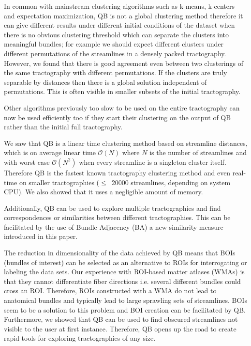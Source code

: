 \documentclass{bioinfo}
\begin{document}
In common with mainstream clustering algorithms such as k-means,
k-centers and expectation maximization, QB is not a global clustering
method therefore it can give different results under different initial
conditions of the dataset when there is no obvious clustering threshold
which can separate the clusters into meaningful bundles; for example we
should expect different clusters under different permutations of the
streamlines in a densely packed tractography. However, we found that
there is good agreement even between two clusterings of the same
tractography with different permutations. If the clusters are truly
separable by distances then there is a global solution independent of
permutations. This is often visible in smaller subsets of the initial
tractography.

Other algorithms previously too slow to be used on the entire
tractography can now be used efficiently too if they start their clustering
on the output of QB rather than the initial full tractography.

We saw that QB is a linear time clustering method based on streamline
distances, which is on average linear time $\mathcal{O}(N)$ where $N$ is
the number of streamlines and with worst case $\mathcal{O}(N^{2})$ when
every streamline is a singleton cluster itself. Therefore QB is the
fastest known tractography clustering method and even real-time on
smaller tractographies ($\le$~\num{20000} streamlines, depending on
system CPU). We also showed that it uses a negligible amount of memory.

Additionally, QB can be used to explore multiple tractographies and find
correspondences or similarities between different tractographies. This
can be facilitated by the use of Bundle Adjacency (BA) a new similarity
measure introduced in this paper.

The reduction in dimensionality of the data achieved by QB means that
BOIs (bundles of interest) can be selected as an alternative to ROIs for
interrogating or labeling the data sets.  Our experience with ROI-based
matter atlases (WMAs) is that they cannot differentiate fiber directions
i.e. several different bundles could cross an ROI. Therefore, ROIs
constructed with a WMA do not lead to anatomical bundles and typically
lead to large sprawling sets of streamlines. BOIs seem to be a solution
to this problem and BOI creation can be facilitated by QB. Furthermore,
we showed that QB can be used to find obscured streamlines not visible
to the user at first instance. Therefore, QB opens up the road to create
rapid tools for exploring tractographies of any size.
\end{document}
